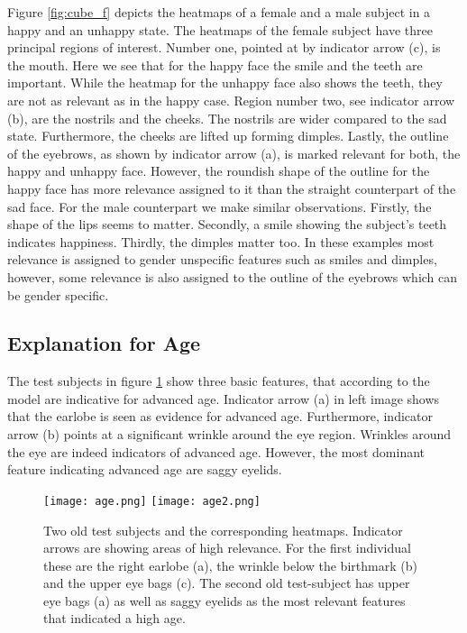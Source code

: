 \documentclass[runningheads]{llncs}
\begin{document}
Figure \ref{fig:cube_f} depicts the heatmaps of a female and a male subject  in a happy and an unhappy state.
The heatmaps of the female subject have three principal regions of interest. Number one, pointed at by indicator arrow (c), is the mouth. Here we see that for the happy face the smile and the teeth are important. While the heatmap for the unhappy face also shows the teeth, they are not as relevant as in the happy case. Region number two, see indicator arrow (b), are the nostrils and the cheeks. The nostrils are wider compared to the sad state. Furthermore, the cheeks are lifted up forming dimples. Lastly, the outline of the eyebrows, as shown by indicator arrow (a), is marked relevant for both, the happy and unhappy face. However, the roundish shape of the outline for the happy face has more relevance assigned to it than the straight counterpart of the sad face.
For the male counterpart we make similar observations. Firstly, the shape of the lips seems to matter. Secondly, a smile showing the subject's teeth indicates happiness. Thirdly, the dimples matter too. In these examples most relevance is assigned to gender unspecific features such as smiles and dimples, however, some relevance is also assigned to the outline of the eyebrows which can be gender specific.

\subsection{Explanation for Age}
The test subjects in figure \ref{fig:age} show three basic features, that according to the model are indicative for advanced age. Indicator arrow (a) in left image shows that the earlobe is seen as evidence for advanced age. Furthermore, indicator arrow (b) points at a significant wrinkle around the eye region. Wrinkles around the eye are indeed indicators of advanced age. However, the most dominant feature indicating advanced age are saggy eyelids.
\begin{figure}[!htb]
\centering
\texttt{[image: age.png]}
\texttt{[image: age2.png]}
\caption{
Two old test subjects and the corresponding heatmaps. Indicator arrows are showing areas of high relevance. For the first individual these are the right earlobe (a), the wrinkle below the birthmark (b) and the upper eye bags (c). The second old test-subject has upper eye bags (a) as well as saggy eyelids as the most relevant features that indicated a high age.
}
\label{fig:age}
\end{figure}
\end{document}
